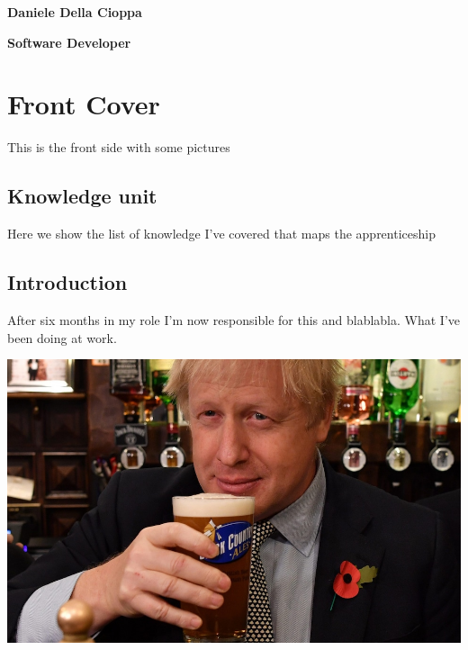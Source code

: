 \documentclass[a4paper,12pt]{article}
\begin{document}
\textbf{Daniele Della Cioppa}

\textbf{Software Developer}

\tableofcontents
\clearpage

\section{Front Cover}
This is the front side with some pictures

\subsection{Knowledge unit}

Here we show the list of knowledge I've covered that maps the apprenticeship 

\subsection{Introduction}

After six months in my role I'm now responsible for this and blablabla. What I've been doing at work.

\includegraphics[width=15cm]{./boris-pintoflager.jpeg}

\printindex
\end{document}
